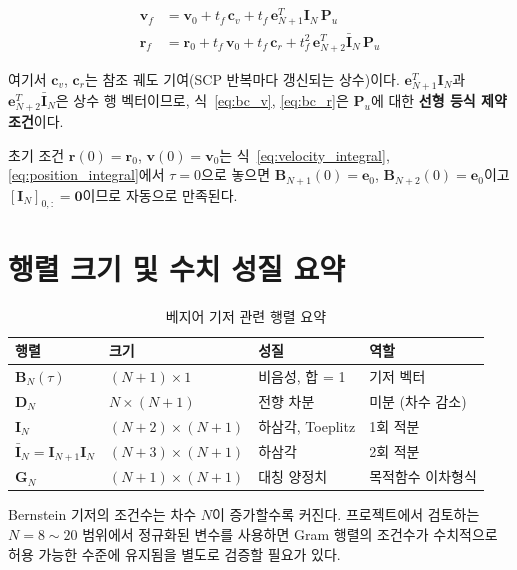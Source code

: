 \documentclass[11pt]{article}
\begin{document}
\begin{align}
  \mathbf{v}_f &= \mathbf{v}_0 + t_f\,\mathbf{c}_v + t_f\,\mathbf{e}_{N+1}^T \mathbf{I}_N\, \mathbf{P}_u \label{eq:bc_v}\\
  \mathbf{r}_f &= \mathbf{r}_0 + t_f\,\mathbf{v}_0 + t_f\,\mathbf{c}_r + t_f^2\,\mathbf{e}_{N+2}^T \bar{\mathbf{I}}_N\, \mathbf{P}_u \label{eq:bc_r}
\end{align}

여기서 $\mathbf{c}_v$, $\mathbf{c}_r$는 참조 궤도 기여(SCP 반복마다 갱신되는 상수)이다.
$\mathbf{e}_{N+1}^T \mathbf{I}_N$과 $\mathbf{e}_{N+2}^T \bar{\mathbf{I}}_N$은 상수 행 벡터이므로,
식~\eqref{eq:bc_v}, \eqref{eq:bc_r}은 $\mathbf{P}_u$에 대한 \textbf{선형 등식 제약조건}이다.

초기 조건 $\mathbf{r}(0) = \mathbf{r}_0$, $\mathbf{v}(0) = \mathbf{v}_0$는
식~\eqref{eq:velocity_integral}, \eqref{eq:position_integral}에서 $\tau=0$으로 놓으면
$\mathbf{B}_{N+1}(0) = \mathbf{e}_0$, $\mathbf{B}_{N+2}(0) = \mathbf{e}_0$이고
$[\mathbf{I}_N]_{0,:} = \mathbf{0}$이므로 자동으로 만족된다.

\section{행렬 크기 및 수치 성질 요약}

\begin{table}[h]
  \centering
  \caption{베지어 기저 관련 행렬 요약}
  \label{tab:matrices}
  \begin{tabular}{llll}
    \toprule
    행렬 & 크기 & 성질 & 역할 \\
    \midrule
    $\mathbf{B}_N(\tau)$   & $(N+1)\times 1$ & 비음성, 합 = 1 & 기저 벡터 \\
    $\mathbf{D}_N$         & $N\times(N+1)$ & 전향 차분 & 미분 (차수 감소) \\
    $\mathbf{I}_N$         & $(N+2)\times(N+1)$ & 하삼각, Toeplitz & 1회 적분 \\
    $\bar{\mathbf{I}}_N = \mathbf{I}_{N+1}\mathbf{I}_N$ & $(N+3)\times(N+1)$ & 하삼각 & 2회 적분 \\
    $\mathbf{G}_N$         & $(N+1)\times(N+1)$ & 대칭 양정치 & 목적함수 이차형식 \\
    \bottomrule
  \end{tabular}
\end{table}

Bernstein 기저의 조건수는 차수 $N$이 증가할수록 커진다.
프로젝트에서 검토하는 $N = 8 \sim 20$ 범위에서 정규화된 변수를 사용하면
Gram 행렬의 조건수가 수치적으로 허용 가능한 수준에 유지됨을 별도로 검증할 필요가 있다.
\end{document}
